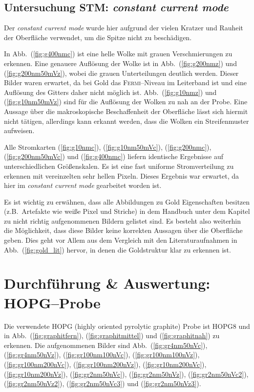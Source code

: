\documentclass[sn-mathphys-num,iicol]{sn-jnl}
\theoremstyle{thmstyleone}
\theoremstyle{thmstyletwo}
\theoremstyle{thmstylethree}
\begin{document}
\subsection{Untersuchung STM: \textit{constant current mode}}
Der \textit{constant current mode} wurde hier aufgrund der vielen Kratzer und Rauheit der Oberfläche verwendet, um die Spitze nicht zu beschädigen.

In Abb.\ (\ref{fig:g400nmc}) ist eine helle Wolke mit grauen Verschmierungen zu erkennen. 
Eine genauere Auflösung der Wolke ist in Abb.\ (\ref{fig:g200nmz}) und (\ref{fig:g200nm50mVz}), wobei die grauen Unterteilungen deutlich werden.
Dieser Bilder waren erwartet, da bei Gold das \textsc{Fermi}--Niveau im Leiterband ist und eine Auflösung des Gitters daher nicht möglich ist.
Abb.\ (\ref{fig:g10nmz}) und (\ref{fig:g10nm50mVz}) sind für die Auflösung der Wolken zu nah an der Probe.
Eine Aussage über die makroskopische Beschaffenheit der Oberfläche lässt sich hiermit nicht tätigen, allerdings kann erkannt werden, dass die Wolken ein Streifenmuster aufweisen.

Alle Stromkarten (\ref{fig:g10nmc}), (\ref{fig:g10nm50mVc}), (\ref{fig:g200nmc}), (\ref{fig:g200nm50mVc}) und (\ref{fig:g400nmc}) liefern identische Ergebnisse auf unterschiedlichen Größenskalen.
Es ist eine fast uniforme Stromverteilung zu erkennen mit vereinzelten sehr hellen Pixeln.
Dieses Ergebnis war erwartet, da hier im \textit{constant current mode} gearbeitet worden ist.

Es ist wichtig zu erwähnen, dass alle Abbildungen zu Gold Eigenschaften besitzen (z.B.\ Artefakte wie weiße Pixel und Striche) in dem Handbuch unter dem Kapitel zu nicht richtig aufgenommenen Bildern gelistet sind.
Es besteht also weiterhin die Möglichkeit, dass diese Bilder keine korrekten Aussagen über die Oberfläche geben.
Dies geht vor Allem aus dem Vergleich mit den Literaturaufnahmen in Abb.\ (\ref{fig:gold_lit}) hervor, in denen die Goldstruktur klar zu erkennen ist.

\section{Durchführung \& Auswertung:\\HOPG--Probe}
Die verwendete HOPG (highly oriented pyrolytic graphite) Probe ist \glqq HOPG8\grqq{} und in Abb.\ (\ref{fig:graphitfern}), (\ref{fig:graphitmittel}) und (\ref{fig:graphitnah}) zu erkennen.
Die aufgenommenen Bilder sind Abb.\ (\ref{fig:gr4nm50nVc}), (\ref{fig:gr4nm50nVz}), (\ref{fig:gr100nm100nVc}), (\ref{fig:gr100nm100nVz}), (\ref{fig:gr100nm200nVc}), (\ref{fig:gr100nm200nVz}), (\ref{fig:gr10nm200nVc}), (\ref{fig:gr10nm200nVz}), (\ref{fig:gr2nm50nVc}), (\ref{fig:gr2nm50nVz}), (\ref{fig:gr2nm50nVc2}), (\ref{fig:gr2nm50nVz2}), (\ref{fig:gr2nm50nVc3}) und (\ref{fig:gr2nm50nVz3}).
\end{document}
